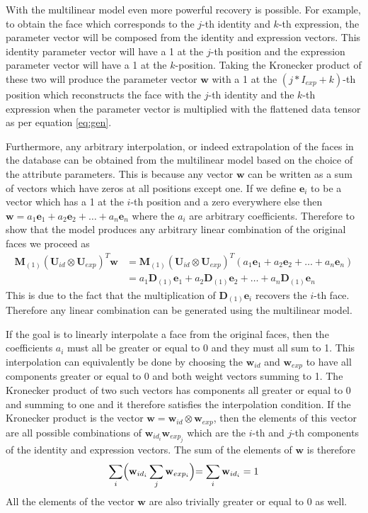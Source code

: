 \documentclass[11pt,a4paper]{report}
\begin{document}
With the multilinear model even more powerful recovery is possible. For
example, to obtain the face which corresponds to the $j$-th identity
and $k$-th expression, the parameter vector will be composed from the identity and
expression vectors. This identity parameter vector will have a 1 at the $j$-th
position and the expression parameter vector will have a 1 at the
$k$-position. Taking the Kronecker product of these two will produce the
parameter vector $\mathbf{w}$ with a 1 at the $(j*I_{exp} + k)$-th position which
reconstructs the face with the $j$-th identity and the $k$-th expression when
the parameter vector is multiplied with the flattened data tensor as per
equation \ref{eq:gen}.

Furthermore, any arbitrary interpolation, or indeed extrapolation of the faces in
the database can be obtained from the multilinear model based on the choice of
the attribute parameters. This is because any vector $\mathbf{w}$ can
be written as a sum of vectors which have zeros at all positions except
one. If we define $\mathbf{e}_i$ to be a vector which has a 1 at the $i$-th position and
a zero everywhere else then $\mathbf{w} = a_1\mathbf{e}_1 + a_2\mathbf{e}_2 +
\ldots + a_n\mathbf{e}_n$ where the $a_i$ are arbitrary coefficients. Therefore to show that the model produces any
arbitrary linear combination of the original faces we proceed as
\begin{align} 
\mathbf{M}_{(1)}(\mathbf{U}_{id} \otimes \mathbf{U}_{exp})^T\mathbf{w} &=
\mathbf{M}_{(1)}(\mathbf{U}_{id} \otimes \mathbf{U}_{exp})^T(a_1\mathbf{e}_1 +
a_2\mathbf{e}_2 + \ldots + a_n\mathbf{e}_n)\\
&=a_1\mathbf{D}_{(1)}\mathbf{e}_1 +
a_2\mathbf{D}_{(1)}\mathbf{e}_2 + \ldots + a_n\mathbf{D}_{(1)}\mathbf{e}_n
\end{align}
This is due to the fact that the multiplication of $\mathbf{D}_{(1)}\mathbf{e}_i$ recovers the
$i$-th face. Therefore any linear combination can be generated using the
multilinear model. 

If the goal is to linearly interpolate a face from the original faces, then the
coefficients $a_i$ must all be greater or equal to 0 and they must all sum to
1. This interpolation can equivalently be done by choosing the $\mathbf{w}_{id}$
and $\mathbf{w}_{exp}$ to have all components greater or equal to 0 and both
weight vectors summing to 1. The Kronecker product of two such vectors has
components all greater or equal to 0 and summing to one and it therefore
satisfies the interpolation condition. If the Kronecker product
is the vector $\mathbf{w} = \mathbf{w}_{id} \otimes \mathbf{w}_{exp}$, then the
elements of this vector are all possible combinations of
$\mathbf{w}_{id_i}\mathbf{w}_{exp_j}$ which are the $i$-th and $j$-th components
of the identity and expression vectors. The sum of the elements of $\mathbf{w}$ is therefore
\begin{equation*}
\sum_i \Bigr(\mathbf{w}_{id_i} \sum_j \mathbf{w}_{exp_i} \Bigl) = \sum_i
\mathbf{w}_{id_i} = 1
\end{equation*}
All the elements of the vector $\mathbf{w}$ are also trivially greater or equal to 0
as well.
\end{document}
